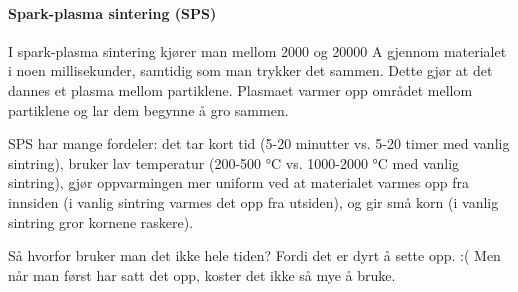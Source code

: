 \paragraph{Spark-plasma sintering (SPS)} I spark-plasma sintering kjører man mellom 2000 og 20000 \si{\ampere} gjennom materialet i noen millisekunder, samtidig som man trykker det sammen. Dette gjør at det dannes et plasma mellom partiklene. Plasmaet varmer opp området mellom partiklene og lar dem begynne å gro sammen.

SPS har mange fordeler: det tar kort tid (5-20 minutter vs. 5-20 timer med vanlig sintring), bruker lav temperatur (200-500 \si{\celsius} vs. 1000-2000 \si{\celsius} med vanlig sintring), gjør oppvarmingen mer uniform ved at materialet varmes opp fra innsiden (i vanlig sintring varmes det opp fra utsiden), og gir små korn (i vanlig sintring gror kornene raskere).

Så hvorfor bruker man det ikke hele tiden? Fordi det er dyrt å sette opp. :( Men når man først har satt det opp, koster det ikke så mye å bruke.